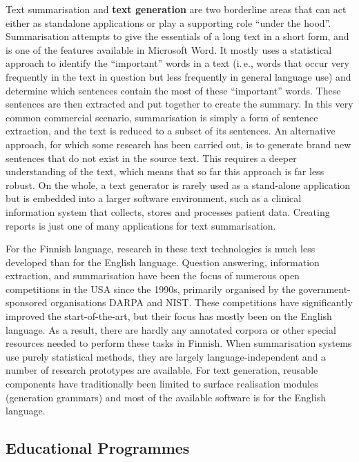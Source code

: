 \begin{multicols}{2}

Text summarisation and \textbf{text generation} are two borderline areas that can act either as standalone applications or play a supporting role ``under the hood''.  Summarisation attempts to give the essentials of a long text in a short form, and is one of the features available in Microsoft Word. It mostly uses a statistical approach to identify the ``important'' words in a text (i.\,e., words that occur very frequently in the text in question but less frequently in general language use) and determine which sentences contain the most of these ``important'' words. These sentences are then extracted and put together to create the summary. In this very common commercial scenario, summarisation is simply a form of sentence extraction, and the text is reduced to a subset of its sentences. An alternative approach, for which some research has been carried out, is to generate brand new sentences that do not exist in the source text. This requires a deeper understanding of the text, which means that so far this approach is far less robust. On the whole, a text generator is rarely used as a stand-alone application but is embedded into a larger software environment, such as a clinical information system that collects, stores and processes patient data. Creating reports is just one of many applications for text summarisation.

For the Finnish language, research in these text technologies is much less developed than for the English language. Question answering, information extraction, and summarisation have been the focus of numerous open competitions in the USA since the 1990s, primarily organised by the government-sponsored organisations DARPA and NIST. These competitions have significantly improved the start-of-the-art, but their focus has mostly been on the English language.  As a result, there are hardly any annotated corpora or other special resources needed to perform these tasks in Finnish. When summarisation systems use purely statistical methods, they are largely language-independent and a number of research prototypes are available. For text generation, reusable components have traditionally been limited to surface realisation modules (generation grammars) and most of the available software is for the English language.

\subsection{Educational Programmes}


\end{multicols}
